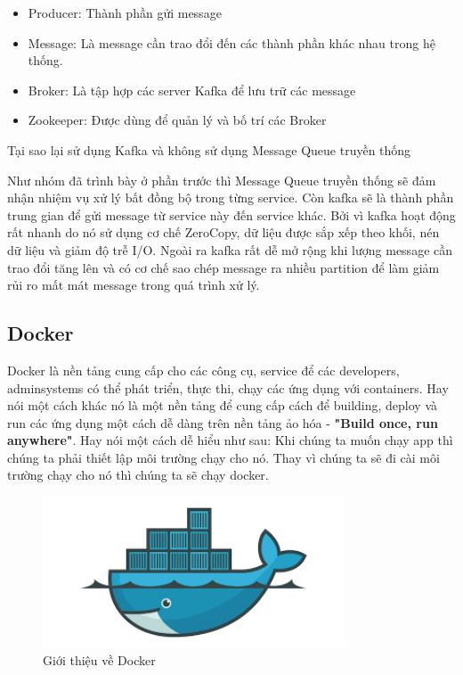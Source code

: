 \begin{itemize}
            \begin{itemize}
                \item Producer: Thành phần gửi message
                \item Message: Là message cần trao đổi đến các thành phần khác nhau trong hệ thống.
                \item Broker: Là tập hợp các server Kafka để lưu trữ các message
                \item Zookeeper: Được dùng để quản lý và bố trí các Broker
            \end{itemize}
            
            Tại sao lại sử dụng Kafka và không sử dụng Message Queue truyền thống
            
            Như nhóm đã trình bày ở phần trước thì Message Queue truyền thống sẽ đảm nhận nhiệm vụ xử lý bất đồng bộ trong từng service. Còn kafka sẽ là thành phần trung gian để gửi message từ service này đến service khác. Bởi vì kafka hoạt động rất nhanh do nó sử dụng cơ chế ZeroCopy, dữ liệu được sắp xếp theo khối, nén dữ liệu và giảm độ trễ I/O. Ngoài ra kafka rất dễ mở rộng khi lượng message cần trao đổi tăng lên và có cơ chế sao chép message ra nhiều partition để làm giảm rủi ro mất mát message trong quá trình xử lý.
            
            \subsection{Docker}
            
            Docker là nền tảng cung cấp cho các công cụ, service để các developers, adminsystems có thể phát triển, thực thi, chạy các ứng dụng với containers. Hay nói một cách khác nó là một nền tảng để cung cấp cách để building, deploy và run các ứng dụng một cách dễ dàng trên nền tảng ảo hóa - \textbf{"Build once, run anywhere"}. Hay nói một cách dễ hiểu như sau: Khi chúng ta muốn chạy app thì chúng ta phải thiết lập môi trường chạy cho nó. Thay vì chúng ta sẽ đi cài môi trường chạy cho nó thì chúng ta sẽ chạy docker.
            
            \begin{figure}[!ht]   			\includegraphics[width=0.8\textwidth]{Images/docker.png}
    		\centering
    		\linebreak
    		\caption{Giới thiệu về Docker}
            \end{figure}
            

\end{itemize}

